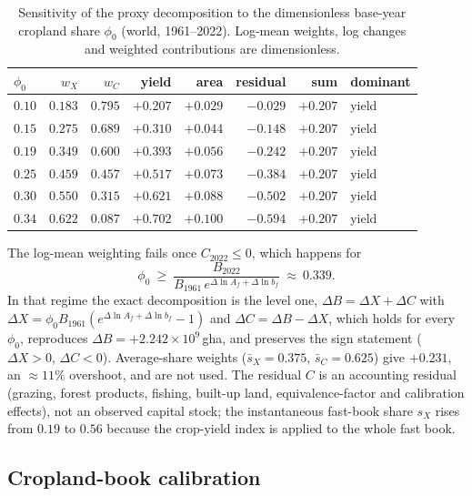 \documentclass[11pt,a4paper]{article}
\begin{document}
\begin{table}[htbp]
\centering\small
\caption{Sensitivity of the proxy decomposition to the dimensionless base-year cropland share $\phi_0$ (world, 1961--2022). Log-mean weights, log changes and weighted contributions are dimensionless.}
\label{tab:si_phi0}
\begin{tabular}{l r r r r r r l}
\toprule
$\phi_0$ & $w_X$ & $w_C$ & yield & area & residual & sum & dominant \\
\midrule
$0.10$ & $0.183$ & $0.795$ & $+0.207$ & $+0.029$ & $-0.029$ & $+0.207$ & yield \\
$0.15$ & $0.275$ & $0.689$ & $+0.310$ & $+0.044$ & $-0.148$ & $+0.207$ & yield \\
$0.19$ & $0.349$ & $0.600$ & $+0.393$ & $+0.056$ & $-0.242$ & $+0.207$ & yield \\
$0.25$ & $0.459$ & $0.457$ & $+0.517$ & $+0.073$ & $-0.384$ & $+0.207$ & yield \\
$0.30$ & $0.550$ & $0.315$ & $+0.621$ & $+0.088$ & $-0.502$ & $+0.207$ & yield \\
$0.34$ & $0.622$ & $0.087$ & $+0.702$ & $+0.100$ & $-0.594$ & $+0.207$ & yield \\
\bottomrule
\end{tabular}
\end{table}

The log-mean weighting fails once $C_{2022}\le0$, which happens for
\begin{equation}
\phi_0\ \ge\ \frac{B_{2022}}{B_{1961}\,e^{\Delta\ln A_f+\Delta\ln b_f}}\ \approx\ 0.339 .
\end{equation}
In that regime the exact decomposition is the level one, $\Delta B=\Delta X+\Delta C$ with $\Delta X=\phi_0 B_{1961}(e^{\Delta\ln A_f+\Delta\ln b_f}-1)$ and $\Delta C=\Delta B-\Delta X$, which holds for every $\phi_0$, reproduces $\Delta B=+2.242\times10^{9}$\,gha, and preserves the sign statement ($\Delta X>0$, $\Delta C<0$). Average-share weights ($\bar s_X=0.375$, $\bar s_C=0.625$) give $+0.231$, an $\approx11\%$ overshoot, and are not used. The residual $C$ is an accounting residual (grazing, forest products, fishing, built-up land, equivalence-factor and calibration effects), not an observed capital stock; the instantaneous fast-book share $s_X$ rises from $0.19$ to $0.56$ because the crop-yield index is applied to the whole fast book.

\subsection{Cropland-book calibration}\label{si:cropland}
\end{document}
